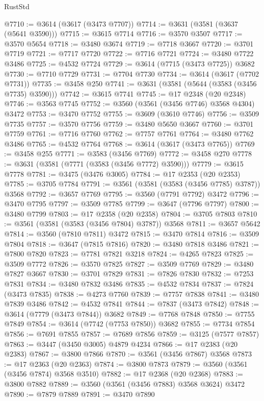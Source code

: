 \begin{lexlean}{RustStd}
\begin{coremodule}
@7710 := @3614 (@3617 (@3473 @7707))
@7714 := @3631 (@3581 (@3637 (@5641 @3590)))
@7715 := @3615 @7714
@7716 := @3570 @3507
@7717 := @3570 @5654
@7718 := @3480 @3674
@7719 := @7718 @3667
@7720 := @3701 @7719
@7721 := @7717 @7720
@7722 := @7716 @7721
@7724 := @3480 @7722 @3486
@7725 := @4532 @7724
@7729 := @3614 (@7715 (@3473 @7725)) @3682
@7730 := @7710 @7729
@7731 := @7704 @7730
@7734 := @3614 (@3617 (@7702 @7731))
@7735 := @3458 @250
@7741 := @3631 (@3581 (@5644 (@3583 (@3456 @7735) @3590)))
@7742 := @3615 @7741
@7745 := @17 @2348 (@20 @2348)
@7746 := @3563 @7745
@7752 := @3560 (@3561 (@3456 @7746) @3568 @4304) @3472
@7753 := @3470 @7752
@7755 := @3609 (@3610 @7746)
@7756 := @3509 @7735
@7757 := @3570 @7756
@7759 := @3480 @5650 @3667
@7760 := @3701 @7759
@7761 := @7716 @7760
@7762 := @7757 @7761
@7764 := @3480 @7762 @3486
@7765 := @4532 @7764
@7768 := @3614 (@3617 (@3473 @7765))
@7769 := @3458 @255
@7771 := @3583 (@3456 @7769)
@7772 := @3458 @270
@7778 := @3631 (@3581 (@7771 (@3583 (@3456 @7772) @3590)))
@7779 := @3615 @7778
@7781 := @3475 (@3476 @3005)
@7784 := @17 @2353 (@20 @2353)
@7785 := @3705 @7784
@7791 := @3561 (@3581 (@3583 (@3456 @7785) @3787)) @3568
@7792 := @3657 @7769
@7795 := @3560 (@7791 @7792) @3472
@7796 := @3470 @7795
@7797 := @3509 @7785
@7799 := @3647 (@7796 @7797)
@7800 := @3480 @7799
@7803 := @17 @2358 (@20 @2358)
@7804 := @3705 @7803
@7810 := @3561 (@3581 (@3583 (@3456 @7804) @3787)) @3568
@7811 := @3657 @5642
@7814 := @3560 (@7810 @7811) @3472
@7815 := @3470 @7814
@7816 := @3509 @7804
@7818 := @3647 (@7815 @7816)
@7820 := @3480 @7818 @3486
@7821 := @7800 @7820
@7823 := @7781 @7821 @3218
@7824 := @4265 @7823
@7825 := @3509 @7772
@7826 := @3570 @7825
@7827 := @3509 @7769
@7829 := @3480 @7827 @3667
@7830 := @3701 @7829
@7831 := @7826 @7830
@7832 := @7253 @7831
@7834 := @3480 @7832 @3486
@7835 := @4532 @7834
@7837 := @7824 (@3473 @7835)
@7838 := @4273 @7760
@7839 := @7757 @7838
@7841 := @3480 @7839 @3486
@7842 := @4532 @7841
@7844 := @7837 (@3473 @7842)
@7848 := @3614 (@7779 (@3473 @7844)) @3682
@7849 := @7768 @7848
@7850 := @7755 @7849
@7854 := @3614 (@7742 (@7753 @7850)) @3682
@7855 := @7734 @7854
@7856 := @7691 @7855
@7857 := @7689 @7856
@7859 := @3125 (@7577 @7857)
@7863 := @3447 (@3450 @3005) @4879 @4234
@7866 := @17 @2383 (@20 @2383)
@7867 := @3800 @7866
@7870 := @3561 (@3456 @7867) @3568
@7873 := @17 @2363 (@20 @2363)
@7874 := @3800 @7873
@7879 := @3560 (@3561 (@3456 @7874) @3568 @3510)
@7882 := @17 @2368 (@20 @2368)
@7883 := @3800 @7882
@7889 := @3560 (@3561 (@3456 @7883) @3568 @3624) @3472
@7890 := @7879 @7889
@7891 := @3470 @7890

\end{coremodule}
\end{lexlean}

